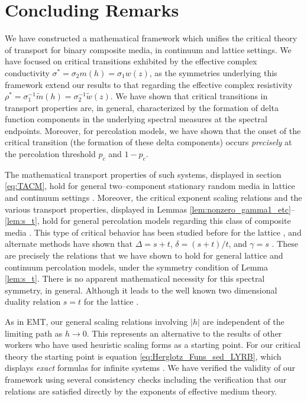 \documentclass[english,12pt,jmp,graphicx]{revtex4-1}
\begin{document}
\section{Concluding Remarks}
%
We have constructed a mathematical framework which unifies the critical
theory of transport for binary composite media, in continuum and
lattice settings. We have focused on critical transitions exhibited by
the effective complex conductivity $\sigma^*=\sigma_2m(h)=\sigma_1w(z)$, as the
symmetries underlying this framework extend our results to that
regarding the effective complex resistivity
$\rho^*=\sigma_1^{-1}\tilde{m}(h)=\sigma_2^{-1}\tilde{w}(z)$. We have
shown that critical transitions in transport properties are, in
general, characterized by the formation of delta function components
in the underlying spectral measures at the spectral
endpoints. Moreover, for percolation models, we have shown that the
onset of the critical transition (the formation of these delta
components) occurs \emph{precisely} at the percolation threshold $p_c$
and $1-p_c$.        

The mathematical transport properties of such systems, displayed in
section \ref{eq:TACM}, hold for general two--component stationary
random media in lattice and continuum settings
\cite{Golden:CMP-473}. Moreover, the critical exponent scaling
relations and the various transport properties, displayed in Lemmas
\ref{lem:nonzero_gamma1_etc}--\ref{lem:s_t}, hold for general
percolation models regarding this class of composite media
\cite{Golden:PRL-3935}. This  type of critical behavior has been
studied before for the lattice 
\cite{Efros:PSSB-303,Clerc:AP-191,Bergman:SSP-147}, and alternate 
methods have shown that $\Delta=s+t$, $\delta=(s+t)/t$, and $\gamma=s$
\cite{Golden:PRL-3935}. These are precisely the relations that we have 
shown to hold for general lattice and continuum percolation models,
under the symmetry condition of Lemma \ref{lem:s_t}. There is no
apparent mathematical necessity for this spectral symmetry, in
general. Although it leads to the well known two dimensional duality
relation $s=t$ for the lattice
\cite{Bergman:SSP-147,Clerc:AP-191,Efros:PSSB-303}. 

As in EMT, our general scaling relations involving $|h|$ are
independent of the limiting path as $h\to0$. This represents an alternative to the
results of other workers
\cite{Efros:PSSB-303,Clerc:AP-191,Bergman:SSP-147} who have used heuristic
scaling forms as a starting point. For our critical
theory the starting point is equation \eqref{eq:Herglotz_Funs_sed_LYRB}, which displays
\emph{exact} formulas for infinite systems \cite{Golden:PRL-3935}. We
have verified the validity of our framework using several consistency
checks including the verification that our relations are satisfied directly
by the exponents of effective medium theory.
\end{document}
